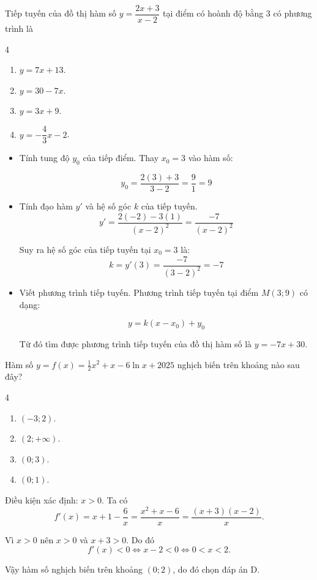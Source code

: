 \begin{baitap}
	Tiếp tuyến của đồ thị hàm số $y = \dfrac{2x + 3}{x - 2}$ tại điểm có hoành độ bằng $3$ có phương trình là
	\begin{multicols}{4}
		\begin{enumerate}
			\item $y = 7x + 13$.
			\item $y = 30 - 7x$.
			\item $y = 3x + 9$.
			\item $y = -\dfrac{4}{3}x - 2$.
		\end{enumerate}
	\end{multicols}
	\begin{traloi}
		\begin{itemize}
			\item Tính tung độ $y_0$ của tiếp điểm.	Thay $x_0 = 3$ vào hàm số:
		
		$$y_0 = \dfrac{2(3) + 3}{3 - 2} = \dfrac{9}{1} = 9$$
		
		\item Tính đạo hàm $y'$ và hệ số góc $k$ của tiếp tuyến.  $$y' = \dfrac{2(-2) - 3(1)}{(x - 2)^2} = \dfrac{-7}{(x - 2)^2}$$
		
		Suy ra hệ số góc của tiếp tuyến tại $x_0 = 3$ là: $$k = y'(3) = \dfrac{-7}{(3 - 2)^2} = -7$$
		
		\item Viết phương trình tiếp tuyến.  Phương trình tiếp tuyến tại điểm $M(3; 9)$ có dạng:
		
		$$y = k(x - x_0) + y_0$$
		
		Từ đó tìm được phương trình tiếp tuyến của đồ thị hàm số là $y = -7x + 30$.
		\end{itemize}
	\end{traloi}
\end{baitap}

\begin{baitap}
	Hàm số $y = f(x) = \frac{1}{2}x^2 + x - 6\ln x + 2025$ nghịch biến trên khoảng nào sau đây?
	\begin{multicols}{4}
		\begin{enumerate}
			\item $(-3; 2)$.
			\item $(2; +\infty)$.
			\item $(0; 3)$.
			\item $(0; 1)$.
		\end{enumerate}
	\end{multicols}
	\begin{traloi}
		\dapan{D}
		Điều kiện xác định: $ x>0. $
		Ta có
		\[
		f'(x)=x+1-\frac6x
		=\frac{x^2+x-6}{x}
		=\frac{(x+3)(x-2)}{x}.
		\]
		
		Vì \(x>0\) nên \(x>0\) và \(x+3>0\). Do đó
		\[
		f'(x)<0\iff x-2<0\iff 0<x<2.
		\]
		
		Vậy hàm số nghịch biến trên khoảng $ (0;2) $, do đó chọn đáp án D.
	\end{traloi}
\end{baitap}

